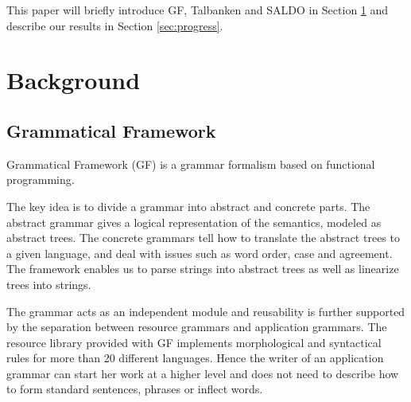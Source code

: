 \documentclass[submission]{eptcs} %
\begin{document}
This paper will briefly introduce GF, Talbanken and SALDO in Section \ref{sec:background}
and describe our results in Section \ref{sec:progress}.

\section{Background}
\label{sec:background}
\subsection{Grammatical Framework}
\label{sec:gf}


Grammatical Framework\cite{ranta-2011} (GF) is a grammar formalism based on functional
programming. %

The key idea is to divide a grammar into abstract and concrete parts. %
The abstract grammar gives a logical representation of the semantics,
modeled as abstract trees.
The concrete grammars tell how to translate the abstract trees to a given language,
and deal with issues such as word order, case and agreement. 
The framework enables us to parse strings into 
abstract trees as well as linearize trees into strings.

The grammar acts as an independent module and
reusability is further supported by the separation between resource grammars
and application grammars. The resource library provided with GF 
implements morphological and
syntactical rules for more than 20 different languages.
Hence the writer of an application grammar can start her work at a higher
level and does not need to describe how to 
form standard sentences, phrases or inflect words.
\end{document}
